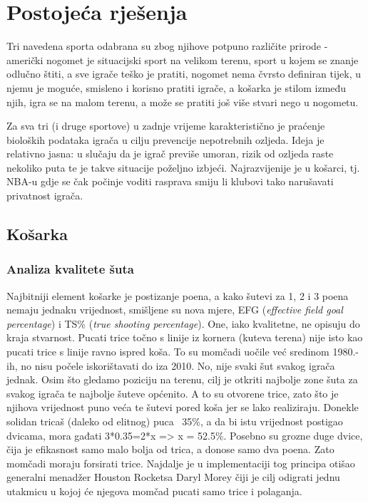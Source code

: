 \documentclass{ferseminar}
\begin{document}
\section{Postojeća rješenja}

Tri navedena sporta odabrana su zbog njihove potpuno različite prirode - američki nogomet je situacijski sport na velikom terenu, sport u kojem se znanje odlučno štiti, a sve igrače teško je pratiti, nogomet nema čvrsto definiran tijek, u njemu je moguće, smisleno i korisno pratiti igrače, a košarka je stilom između njih, igra se na malom terenu, a može se pratiti još više stvari nego u nogometu.

Za sva tri (i druge sportove) u zadnje vrijeme karakteristično je praćenje bioloških podataka igrača u cilju prevencije nepotrebnih ozljeda. Ideja je relativno jasna: u slučaju da je igrač previše umoran, rizik od ozljeda raste nekoliko puta te je takve situacije poželjno izbjeći. Najrazvijenije je u košarci, tj. NBA-u gdje se čak počinje voditi rasprava smiju li klubovi tako narušavati privatnost igrača. \cite{bio}

\subsection{Košarka}

\subsubsection{Analiza kvalitete šuta} 
Najbitniji element košarke je postizanje poena, a kako šutevi za 1, 2 i 3 poena nemaju jednaku vrijednost, smišljene su nova mjere, EFG (\textit{effective field goal percentage}) i TS\% (\textit{true shooting percentage}). One, iako kvalitetne, ne opisuju do kraja stvarnost. Pucati trice točno s linije iz kornera (kuteva terena) nije isto kao pucati trice s linije ravno ispred koša. To su momčadi uočile već sredinom 1980.-ih, no nisu počele iskorištavati do iza 2010. \cite{corner3s} No, nije svaki šut svakog igrača jednak. Osim što gledamo poziciju na terenu, cilj je otkriti najbolje zone šuta za svakog igrača te najbolje šuteve općenito. A to su otvorene trice, zato što je njihova vrijednost puno veća te šutevi pored koša jer se lako realiziraju. Donekle solidan tricaš (daleko od elitnog) puca ~35\%, a da bi istu vrijednost postigao dvicama, mora gađati 3*0.35=2*x => x = 52.5\%. Posebno su grozne duge dvice, čija je efikasnost samo malo bolja od trica, a donose samo dva poena. Zato momčadi moraju forsirati trice. \cite{NBAshots} Najdalje je u implementaciji tog principa otišao generalni menadžer Houston Rocketsa Daryl Morey čiji je cilj odigrati jednu utakmicu u kojoj će njegova momčad pucati samo trice i polaganja.
\end{document}
